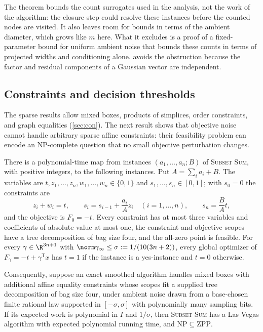 The theorem bounds the count surrogates used in the analysis, not the work
of the algorithm: the closure step could resolve these instances before the
counted nodes are visited. It also leaves room for bounds in terms of the
ambient diameter, which grows like $m$ here. What it excludes is a proof of
a fixed-parameter bound for uniform ambient noise that bounds these counts
in terms of projected widths and conditioning alone. 
avoids the obstruction because the factor and residual components of a
Gaussian vector are independent.

\subsection{Constraints and decision thresholds}\label{sec:lim:constraints}

The sparse results allow mixed boxes, products of simplices, order
constraints, and graph equalities (\cref{sec:con}). The next result shows
that objective noise cannot handle arbitrary sparse affine constraints:
their feasibility problem can encode an NP-complete question that no small
objective perturbation changes.

\begin{theorem}\label{thm:lim:constraints}
There is a polynomial-time map from instances $(a_1,\ldots,a_n;B)$ of
\textup{\textsc{Subset Sum}}, with positive integers, to the following instances.
Put $A=\sum_ia_i+B$. The variables are $t,z_1,\ldots,z_n,w_1,\ldots,w_n\in
\{0,1\}$ and $s_1,\ldots,s_n\in[0,1]$; with $s_0=0$ the constraints are
\[
 z_i+w_i=t,\qquad s_i=s_{i-1}+\frac{a_i}Az_i\quad(i=1,\ldots,n),\qquad
 s_n=\frac BAt,
\]
and the objective is $F_0=-t$. Every constraint has at most three variables
and coefficients of absolute value at most one, the constraint and objective
scopes have a tree decomposition of bag size four, and the all-zero point is
feasible. For every $\gamma\in\R^{3n+1}$ with
$\norm\gamma_\infty\le\sigma:=1/(10(3n+2))$, every global optimizer of
$F_\gamma=-t+\gamma^{\mathsf T}x$ has $t=1$ if the instance is a
yes-instance and $t=0$ otherwise.

Consequently, suppose an exact smoothed algorithm handles mixed boxes with
additional affine equality constraints whose scopes fit a supplied tree
decomposition of bag size four, under ambient noise drawn from a
base-chosen finite rational law supported in $[-\sigma,\sigma]$ with
polynomially many sampling bits. If its expected work is polynomial in $I$
and $1/\sigma$, then \textup{\textsc{Subset Sum}} has a Las Vegas algorithm with
expected polynomial running time, and $\mathrm{NP}\subseteq\mathrm{ZPP}$.
\end{theorem}

